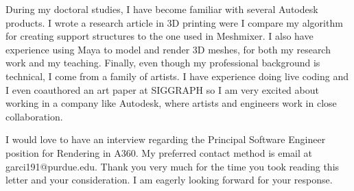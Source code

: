 \documentclass[10pt,stdletter,dateno,sigleft,letterpaper]{newlfm} %
\begin{document}
\begin{newlfm}

During my doctoral studies, I have become familiar with several Autodesk products. I wrote a research article in 3D printing were I compare my algorithm for creating support structures to the one used in Meshmixer. I also have experience using Maya to model and render 3D meshes, for both my research work and my teaching. Finally, even though my professional background is technical, I come from a family of artists. I have experience doing live coding and I even coauthored an art paper at SIGGRAPH so I am very excited about working in a company like Autodesk, where artists and engineers work in close collaboration.


I would love to have an interview regarding the Principal Software Engineer position for Rendering in A360. My preferred contact method is email at garci191@purdue.edu. Thank you very much for the time you took reading this letter and your consideration. I am eagerly looking forward for your response.


\end{newlfm}
\end{document}
